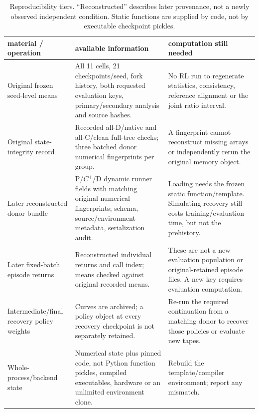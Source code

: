 \begin{table}[ht]
\centering
\caption{Reproducibility tiers. ``Reconstructed'' describes later provenance, not a newly observed independent condition. Static functions are supplied by code, not by executable checkpoint pickles.}
\label{app:availabilitymatrix}
\small
\begin{tabularx}{\linewidth}{@{}>{\raggedright\arraybackslash}p{3.6cm}XX@{}}
\toprule
material / operation & available information & computation still needed \\
\midrule
Original frozen seed-level means & All 11 cells, 21 checkpoints/seed, fork history, both requested evaluation keys, primary/secondary analysis and source hashes. & No RL run to regenerate statistics, consistency, reference alignment or the joint ratio interval. \\
Original state-integrity record & Recorded all-D/native and all-C/clean full-tree checks; three batched donor numerical fingerprints per group. & A fingerprint cannot reconstruct missing arrays or independently rerun the original memory object. \\
Later reconstructed donor bundle & P/$C^+$/D dynamic runner fields with matching original numerical fingerprints; schema, source/environment metadata, serialization audit. & Loading needs the frozen static function/template. Simulating recovery still costs training/evaluation time, but not the prehistory. \\
Later fixed-batch episode returns & Reconstructed individual returns and call index; means checked against original recorded means. & These are not a new evaluation population or original-retained episode files. A new key requires evaluation computation. \\
Intermediate/final recovery policy weights & Curves are archived; a policy object at every recovery checkpoint is not separately retained. & Re-run the required continuation from a matching donor to recover those policies or evaluate new tapes. \\
Whole-process/backend state & Numerical state plus pinned code, not Python function pickles, compiled executables, hardware or an unlimited environment clone. & Rebuild the template/compiler environment; report any mismatch. \\
\bottomrule
\end{tabularx}
\end{table}

